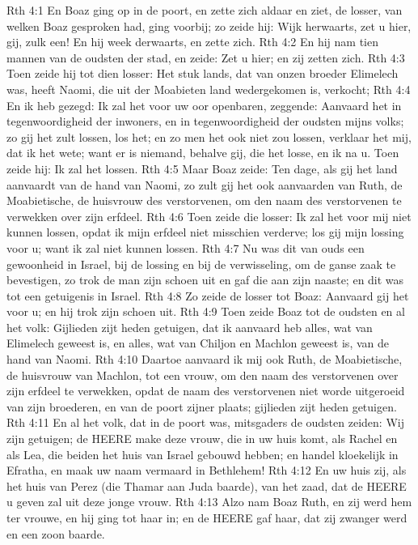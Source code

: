 Rth 4:1  En Boaz ging op in de poort, en zette zich aldaar en ziet, de losser, van welken Boaz gesproken had, ging voorbij; zo zeide hij: Wijk herwaarts, zet u hier, gij, zulk een! En hij week derwaarts, en zette zich.
Rth 4:2  En hij nam tien mannen van de oudsten der stad, en zeide: Zet u hier; en zij zetten zich.
Rth 4:3  Toen zeide hij tot dien losser: Het stuk lands, dat van onzen broeder Elimelech was, heeft Naomi, die uit der Moabieten land wedergekomen is, verkocht;
Rth 4:4  En ik heb gezegd: Ik zal het voor uw oor openbaren, zeggende: Aanvaard het in tegenwoordigheid der inwoners, en in tegenwoordigheid der oudsten mijns volks; zo gij het zult lossen, los het; en zo men het ook niet zou lossen, verklaar het mij, dat ik het wete; want er is niemand, behalve gij, die het losse, en ik na u. Toen zeide hij: Ik zal het lossen.
Rth 4:5  Maar Boaz zeide: Ten dage, als gij het land aanvaardt van de hand van Naomi, zo zult gij het ook aanvaarden van Ruth, de Moabietische, de huisvrouw des verstorvenen, om den naam des verstorvenen te verwekken over zijn erfdeel.
Rth 4:6  Toen zeide die losser: Ik zal het voor mij niet kunnen lossen, opdat ik mijn erfdeel niet misschien verderve; los gij mijn lossing voor u; want ik zal niet kunnen lossen.
Rth 4:7  Nu was dit van ouds een gewoonheid in Israel, bij de lossing en bij de verwisseling, om de ganse zaak te bevestigen, zo trok de man zijn schoen uit en gaf die aan zijn naaste; en dit was tot een getuigenis in Israel.
Rth 4:8  Zo zeide de losser tot Boaz: Aanvaard gij het voor u; en hij trok zijn schoen uit.
Rth 4:9  Toen zeide Boaz tot de oudsten en al het volk: Gijlieden zijt heden getuigen, dat ik aanvaard heb alles, wat van Elimelech geweest is, en alles, wat van Chiljon en Machlon geweest is, van de hand van Naomi.
Rth 4:10  Daartoe aanvaard ik mij ook Ruth, de Moabietische, de huisvrouw van Machlon, tot een vrouw, om den naam des verstorvenen over zijn erfdeel te verwekken, opdat de naam des verstorvenen niet worde uitgeroeid van zijn broederen, en van de poort zijner plaats; gijlieden zijt heden getuigen.
Rth 4:11  En al het volk, dat in de poort was, mitsgaders de oudsten zeiden: Wij zijn getuigen; de HEERE make deze vrouw, die in uw huis komt, als Rachel en als Lea, die beiden het huis van Israel gebouwd hebben; en handel kloekelijk in Efratha, en maak uw naam vermaard in Bethlehem!
Rth 4:12  En uw huis zij, als het huis van Perez (die Thamar aan Juda baarde), van het zaad, dat de HEERE u geven zal uit deze jonge vrouw.
Rth 4:13  Alzo nam Boaz Ruth, en zij werd hem ter vrouwe, en hij ging tot haar in; en de HEERE gaf haar, dat zij zwanger werd en een zoon baarde.

